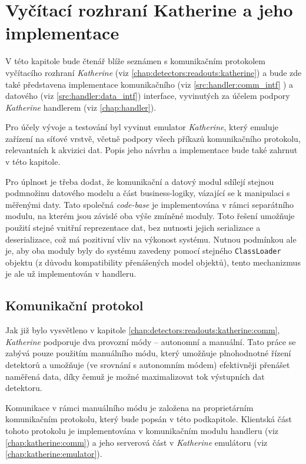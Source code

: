 

\chapter{Vyčítací rozhraní Katherine a jeho implementace}\label{chap:katherine}
V této kapitole bude čtenář blíže seznámen s komunikačním protokolem vyčítacího rozhraní \textit{Katherine} (viz \ref{chap:detectors:readouts:katherine}) a bude zde také představena implementace komunikačního (viz \ref{src:handler:comm_intf} ) a datového (viz \ref{src:handler:data_intf}) interface, vyvinutých za účelem podpory \textit{Katherine} handlerem (viz \ref{chap:handler}). 

Pro účely vývoje a testování byl vyvinut emulator \textit{Katherine}, který emuluje zařízení na síťové vrstvě, včetně podpory všech příkazů komunikačního protokolu, relevantních k akvizici dat. Popis jeho návrhu a implementace bude také zahrnut v této kapitole.

Pro úplnost je třeba dodat, že komunikační a datový modul sdílejí stejnou podmnožinu datového modelu a část business-logiky, vázající se k manipulaci s měřenými daty. Tato společná \textit{code-base} je implementována v rámci separátního modulu, na kterém jsou závislé oba výše zmíněné moduly. Toto řešení umožňuje použití stejné vnitřní reprezentace dat, bez nutnosti jejich serializace a deserializace, což má pozitivní vliv na výkonost systému. Nutnou podmínkou ale je, aby oba moduly byly do systému zavedeny pomocí stejného \texttt{ClassLoader} objektu (z důvodu kompatibility přenášených model objektů), tento mechanizmus je ale už implementován v handleru.

\section{Komunikační protokol}\label{chap:katherine:protocol}
Jak již bylo vysvětleno v kapitole \ref{chap:detectors:readouts:katherine:comm}, \textit{Katherine} podporuje dva provozní módy -- autonomní a manuální. Tato práce se zabývá pouze použitím manuálního módu, který umožňuje plnohodnotné řízení detektorů a umožňuje (ve srovnání s autonomním módem) efektivněji přenášet naměřená data, díky čemuž je možné maximalizovat tok výstupních dat detektoru.

Komunikace v rámci manuálního módu je založena na proprietárním komunikačním protokolu, který bude popsán v této podkapitole. Klientská část tohoto protokolu je implementována v komunikačním modulu handleru (viz \ref{chap:katherine:comm}) a jeho serverová část v \textit{Katherine} emulátoru (viz \ref{chap:katherine:emulator}).

